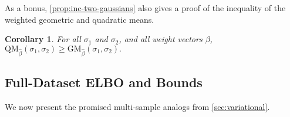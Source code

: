 \documentclass[twoside]{article}
\makeatletter
\theoremstyle{plain}
\newtheorem{coro}{Corollary}[theorem]
\newtheorem{prop}[theorem]{Proposition}
\theoremstyle{definition}
\let\H\relax
\DeclareMathOperator{\H}{\mathrm{H}} %
\DeclareMathOperator*{\Ex}{\mathbb{E}} %
\newcommand{\datadist}[1]{\Pr\nolimits_{#1}}
\newcommand\aar{\@ifstar\aar@one@star\aar@plain}
\newcommand\aar@one@star{\@ifstar\aar@resize{\aar@plain*}}
\newcommand\aar@resize[1]{\sbox{\aar@content}{#1}\scaleleftright[3.8ex]
		{\Biggl\langle\!\!\!\!\Biggl\langle}{\usebox{\aar@content}}
		{\Biggr\rangle\!\!\!\!\Biggr\rangle}}
\makeatother
\begin{document}
As a bonus, \cref{prop:inc-two-gaussians} also gives a proof of the inequality of the weighted geometric and quadratic means.
\begin{coro} For all $\sigma_1$ and $\sigma_2$, and all weight vectors $\beta$,
	$
	{\mathrm {QM}_{\hat\beta}(\sigma_1,\sigma_2)} \ge {\mathrm {GM}_{\hat\beta}(\sigma_1,\sigma_2)}.
	$
\end{coro}

\subsection{Full-Dataset ELBO and Bounds}

We now present the promised multi-sample analogs from \cref{sec:variational}.

%
\end{document}
